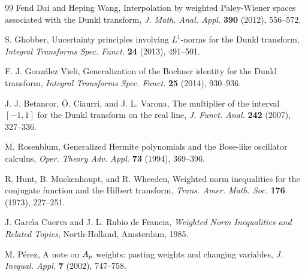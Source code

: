 \documentclass[a4paper]{amsart}
\numberwithin{equation}{section}
\theoremstyle{plain}
\theoremstyle{remark}
\begin{document}
\begin{thebibliography}{99}
 Fend Dai and Heping Wang,  
Interpolation by weighted Paley-Wiener spaces associated with the Dunkl transform, 
\textit{J. Math. Anal. Appl.} 
\textbf{390} (2012), 556--572.

 S. Ghobber, 
Uncertainty principles involving $L^1$-norms for the Dunkl transform, 
\textit{Integral Transforms Spec. Funct.} 
\textbf{24} (2013), 491--501.

 F. J. Gonz\'alez Vieli, 
Generalization of the Bochner identity for the Dunkl transform, 
\textit{Integral Transforms Spec. Funct.} 
\textbf{25} (2014), 930--936. 

 J. J. Betancor, \'O. Ciaurri, and J. L. Varona,
{The multiplier of the interval $[-1,1]$ for the Dunkl transform on the real line},
\textit{J. Funct. Anal.}
\textbf{242} (2007), 327--336.

 M. Rosenblum,
{Generalized Hermite polynomials and the Bose-like oscillator calculus},
\textit{Oper. Theory Adv. Appl.}
\textbf{73} (1994), 369--396.

 R. Hunt, B. Muckenhoupt, and R. Wheeden,
{Weighted norm inequalities for the conjugate function and the Hilbert transform},
\textit{Trans. Amer. Math. Soc.}
\textbf{176} (1973), 227--251.

 J. Garc\'{\i}a Cuerva and J. L. Rubio de Francia,
\textit{Weighted Norm Inequalities and Related Topics},
North-Holland, Amsterdam, 1985.

 M. P\'erez,
{A note on $A\sb p$ weights: pasting weights and changing variables},
\textit{J. Inequal. Appl.}
\textbf{7} (2002), 747--758.











\end{thebibliography}
\end{document}
